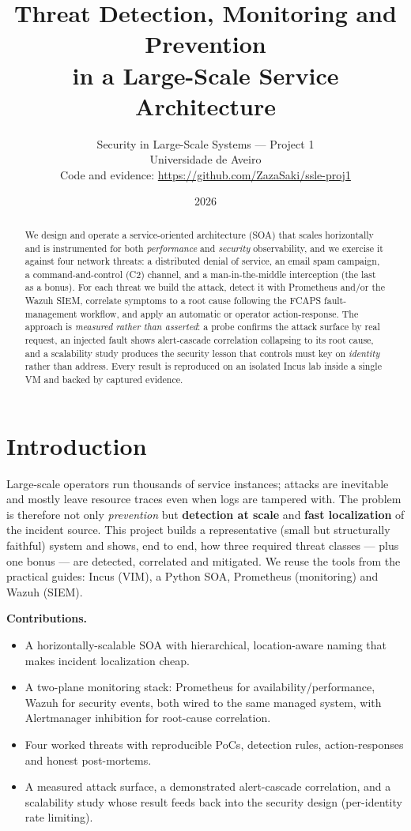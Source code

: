 \documentclass[11pt,a4paper]{article}
\title{\textbf{Threat Detection, Monitoring and Prevention\\in a Large-Scale Service Architecture}}
\author{Security in Large-Scale Systems --- Project 1\\Universidade de Aveiro\\[2pt]
\normalsize Code and evidence: \url{https://github.com/ZazaSaki/ssle-proj1}}
\date{2026}
\begin{document}
\maketitle

\begin{abstract}
\noindent
We design and operate a service-oriented architecture (SOA) that scales horizontally and is
instrumented for both \emph{performance} and \emph{security} observability, and we exercise it
against four network threats: a distributed denial of service, an email spam campaign, a
command-and-control (C2) channel, and a man-in-the-middle interception (the last as a bonus).
For each threat we build the attack, detect it with Prometheus and/or the Wazuh SIEM, correlate
symptoms to a root cause following the FCAPS fault-management workflow, and apply an automatic or
operator action-response. The approach is \emph{measured rather than asserted}: a probe confirms
the attack surface by real request, an injected fault shows alert-cascade correlation collapsing
to its root cause, and a scalability study produces the security lesson that controls must key on
\emph{identity} rather than address. Every result is reproduced on an isolated Incus lab inside a
single VM and backed by captured evidence.
\end{abstract}

\section{Introduction}
Large-scale operators run thousands of service instances; attacks are inevitable and mostly
leave resource traces even when logs are tampered with. The problem is therefore not only
\emph{prevention} but \textbf{detection at scale} and \textbf{fast localization} of the incident
source. This project builds a representative (small but structurally faithful) system and shows,
end to end, how three required threat classes --- plus one bonus --- are detected, correlated and
mitigated. We reuse the tools from the practical guides: Incus (VIM), a Python SOA, Prometheus
(monitoring) and Wazuh (SIEM).

\noindent\textbf{Contributions.}
\begin{itemize}
  \item A horizontally-scalable SOA with hierarchical, location-aware naming that makes incident
        localization cheap.
  \item A two-plane monitoring stack: Prometheus for availability/performance, Wazuh for security
        events, both wired to the same managed system, with Alertmanager inhibition for root-cause
        correlation.
  \item Four worked threats with reproducible PoCs, detection rules, action-responses and honest
        post-mortems.
  \item A measured attack surface, a demonstrated alert-cascade correlation, and a scalability
        study whose result feeds back into the security design (per-identity rate limiting).
\end{itemize}
\end{document}
